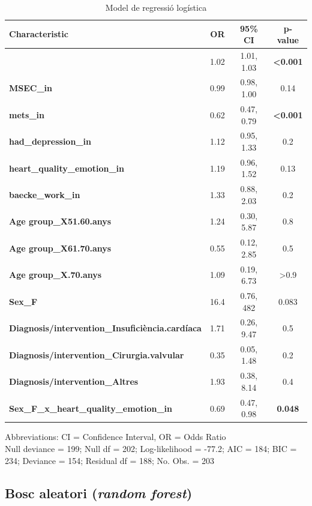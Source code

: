 \documentclass[CAT]{TFUOC}%
\begin{document}
\begin{table}[t]
\caption{\label{tab:glm-coefs}Model de regressió logística} 
\fontsize{12.0pt}{14.0pt}\selectfont
\begin{tabular*}{\linewidth}{@{\extracolsep{\fill}}lccc}
\toprule
\textbf{Characteristic} & \textbf{OR} & \textbf{95\% CI} & \textbf{p-value} \\ 
\midrule\addlinespace[2.5pt]
{\bfseries 6MWT\_in} & 1.02 & 1.01, 1.03 & {\bfseries <0.001} \\ 
{\bfseries MSEC\_in} & 0.99 & 0.98, 1.00 & 0.14 \\ 
{\bfseries mets\_in} & 0.62 & 0.47, 0.79 & {\bfseries <0.001} \\ 
{\bfseries had\_depression\_in} & 1.12 & 0.95, 1.33 & 0.2 \\ 
{\bfseries heart\_quality\_emotion\_in} & 1.19 & 0.96, 1.52 & 0.13 \\ 
{\bfseries baecke\_work\_in} & 1.33 & 0.88, 2.03 & 0.2 \\ 
{\bfseries Age group\_X51.60.anys} & 1.24 & 0.30, 5.87 & 0.8 \\ 
{\bfseries Age group\_X61.70.anys} & 0.55 & 0.12, 2.85 & 0.5 \\ 
{\bfseries Age group\_X.70.anys} & 1.09 & 0.19, 6.73 & >0.9 \\ 
{\bfseries Sex\_F} & 16.4 & 0.76, 482 & 0.083 \\ 
{\bfseries Diagnosis/intervention\_Insuficiència.cardíaca} & 1.71 & 0.26, 9.47 & 0.5 \\ 
{\bfseries Diagnosis/intervention\_Cirurgia.valvular} & 0.35 & 0.05, 1.48 & 0.2 \\ 
{\bfseries Diagnosis/intervention\_Altres} & 1.93 & 0.38, 8.14 & 0.4 \\ 
{\bfseries Sex\_F\_x\_heart\_quality\_emotion\_in} & 0.69 & 0.47, 0.98 & {\bfseries 0.048} \\ 
\bottomrule
\end{tabular*}
\begin{minipage}{\linewidth}
\vspace{.05em}
Abbreviations: CI = Confidence Interval, OR = Odds Ratio\\
Null deviance = 199; Null df = 202; Log-likelihood = -77.2; AIC = 184; BIC = 234; Deviance = 154; Residual df = 188; No. Obs. = 203\\
\end{minipage}
\end{table}

\subsection{\texorpdfstring{Bosc aleatori (\emph{random forest})}{Bosc aleatori (random forest)}}\label{bosc-aleatori-random-forest}
\end{document}
